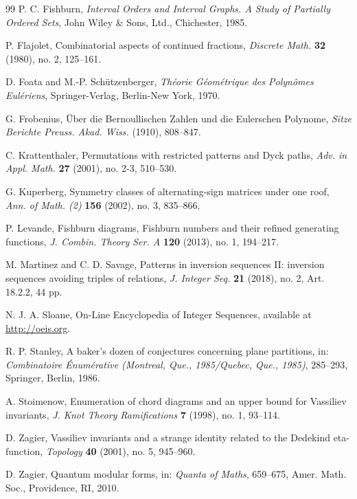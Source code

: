 \documentclass[12pt,reqno]{amsart}
\numberwithin{equation}{section}
\theoremstyle{theorem}
\theoremstyle{definition}
\theoremstyle{named}
\begin{document}
\begin{thebibliography}{99}
	P. C. Fishburn, \textit{Interval Orders and Interval Graphs. A Study of Partially Ordered Sets}, John Wiley \& Sons, Ltd., Chichester, 1985.
	
	P. Flajolet, Combinatorial aspects of continued fractions, \textit{Discrete Math.} \textbf{32} (1980), no. 2, 125--161.
	
	D. Foata and M.-P. Sch\"utzenberger, \textit{Th\'eorie G\'eom\'etrique des Polyn\^omes Eul\'eriens}, Springer-Verlag, Berlin-New York, 1970.
	
	G. Frobenius, \"Uber die Bernoullischen Zahlen und die Eulerschen Polynome, \textit{Sitze Berichte Preuss. Akad. Wiss.} (1910), 808--847.
	
	C. Krattenthaler, Permutations with restricted patterns and Dyck paths, \textit{Adv. in Appl. Math.} \textbf{27} (2001), no. 2-3, 510--530.
	
	G. Kuperberg, Symmetry classes of alternating-sign matrices under one roof, \textit{Ann. of Math. (2)} \textbf{156} (2002), no. 3, 835--866.
	
	P. Levande, Fishburn diagrams, Fishburn numbers and their refined generating functions, \textit{J. Combin. Theory Ser. A} \textbf{120} (2013), no. 1, 194--217.
	
	M. Martinez and C. D. Savage, Patterns in inversion sequences II: inversion sequences avoiding triples of relations, \textit{J. Integer Seq.} \textbf{21} (2018), no. 2, Art. 18.2.2, 44 pp.
	
	N. J. A. Sloane, On-Line Encyclopedia of Integer Sequences, available at \url{http://oeis.org}.
	
	R. P. Stanley, A baker's dozen of conjectures concerning plane partitions, in: \textit{Combinatoire \'Enum\'erative (Montreal, Que., 1985/Quebec, Que., 1985)}, 285--293, Springer, Berlin, 1986.
	
	A. Stoimenow, Enumeration of chord diagrams and an upper bound for Vassiliev invariants, \textit{J. Knot Theory Ramifications} \textbf{7} (1998), no. 1, 93--114.
	
	D. Zagier, Vassiliev invariants and a strange identity related to the Dedekind eta-function, \textit{Topology} \textbf{40} (2001), no. 5, 945--960.
	
	D. Zagier, Quantum modular forms, in: \textit{Quanta of Maths}, 659--675, Amer. Math. Soc., Providence, RI, 2010.
	
\end{thebibliography}
	
\end{document}
